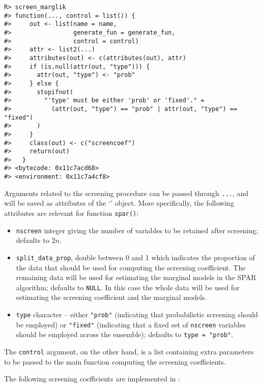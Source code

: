 \documentclass[
  article]{jss}
\newcommand{\class}[1]{`\code{#1}'}
\begin{document}
\begin{verbatim}
R> screen_marglik
#> function(..., control = list()) {
#>     out <- list(name = name,
#>                 generate_fun = generate_fun,
#>                 control = control)
#>     attr <- list2(...)
#>     attributes(out) <- c(attributes(out), attr)
#>     if (is.null(attr(out, "type"))) {
#>       attr(out, "type") <- "prob"
#>     } else {
#>       stopifnot(
#>         "'type' must be either 'prob' or 'fixed'." =
#>           (attr(out, "type") == "prob" | attr(out, "type") == "fixed")
#>       )
#>     }
#>     class(out) <- c("screencoef")
#>     return(out)
#>   }
#> <bytecode: 0x11c7acd68>
#> <environment: 0x11c7a4cf8>
\end{verbatim}

Arguments related to the screening procedure can be passed through
\texttt{...}, and will be saved as attributes of the \class{screencoef}
object. More specifically, the following attributes are relevant for
function \texttt{spar()}:

\begin{itemize}
\item
  \texttt{nscreen} integer giving the number of variables to be retained
  after screening; defaults to \(2n\).
\item
  \texttt{split\_data\_prop}, double between 0 and 1 which indicates the
  proportion of the data that should be used for computing the screening
  coefficient. The remaining data will be used for estimating the
  marginal models in the SPAR algorithm; defaults to \texttt{NULL}. In
  this case the whole data will be used for estimating the screening
  coefficient and the marginal models.
\item
  \texttt{type} character -- either \texttt{"prob"} (indicating that
  probabilistic screening should be employed) or \texttt{"fixed"}
  (indicating that a fixed set of \texttt{nscreen} variables should be
  employed across the ensemble); defaults to \texttt{type\ =\ "prob"}.
\end{itemize}

The \texttt{control} argument, on the other hand, is a list containing
extra parameters to be passed to the main function computing the
screening coefficients.

The following screening coefficients are implemented in :
\end{document}
